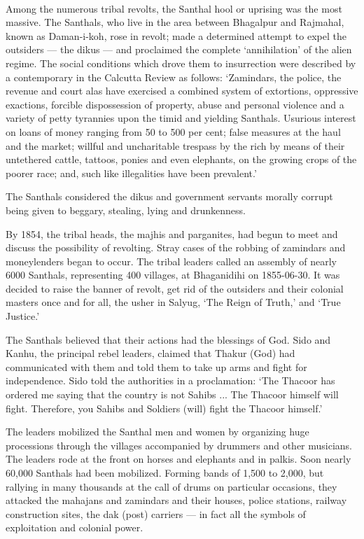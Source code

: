 \begin{multicols}{2}
\paragraph*{}
Among the numerous tribal revolts, the Santhal hool or uprising was the most massive. The Santhals, who live in the area between Bhagalpur and Rajmahal, known as Daman-i-koh, rose in revolt; made a determined attempt to expel the outsiders --- the dikus --- and proclaimed the complete `annihilation' of the alien regime. The social conditions which drove them to insurrection were described by a contemporary in the Calcutta Review as follows: `Zamindars, the police, the revenue and court alas have exercised a combined system of extortions, oppressive exactions, forcible dispossession of property, abuse and personal violence and a variety of petty tyrannies upon the timid and yielding Santhals. Usurious interest on loans of money ranging from 50 to 500 per cent; false measures at the haul and the market; willful and uncharitable trespass by the rich by means of their untethered cattle, tattoos, ponies and even elephants, on the growing crops of the poorer race; and, such like illegalities have been prevalent.'

The Santhals considered the dikus and government servants morally corrupt being given to beggary, stealing, lying and drunkenness.

By 1854, the tribal heads, the majhis and parganites, had begun to meet and discuss the possibility of revolting. Stray cases of the robbing of zamindars and moneylenders began to occur. The tribal leaders called an assembly of nearly 6000 Santhals, representing 400 villages, at Bhaganidihi on 1855-06-30. It was decided to raise the banner of revolt, get rid of the outsiders and their colonial masters once and for all, the usher in Salyug, `The Reign of Truth,' and `True Justice.'

The Santhals believed that their actions had the blessings of God. Sido and Kanhu, the principal rebel leaders, claimed that Thakur (God) had communicated with them and told them to take up arms and fight for independence. Sido told the authorities in a proclamation: `The Thacoor has ordered me saying that the country is not Sahibs ... The Thacoor himself will fight. Therefore, you Sahibs and Soldiers (will) fight the Thacoor himself.'

The leaders mobilized the Santhal men and women by organizing huge processions through the villages accompanied by drummers and other musicians. The leaders rode at the front on horses and elephants and in palkis. Soon nearly 60,000 Santhals had been mobilized. Forming bands of 1,500 to 2,000, but rallying in many thousands at the call of drums on particular occasions, they attacked the mahajans and zamindars and their houses, police stations, railway construction sites, the dak (post) carriers --- in fact all the symbols of exploitation and colonial power.


\end{multicols}
